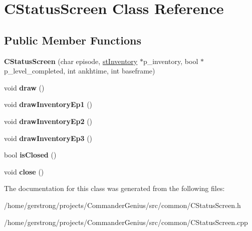 \hypertarget{class_c_status_screen}{
\section{CStatusScreen Class Reference}
\label{class_c_status_screen}
}
\subsection*{Public Member Functions}
\begin{DoxyCompactItemize}
\item 
\hypertarget{class_c_status_screen_ab32df5e8823c2b4a87e562864335e7ad}{
{\bfseries CStatusScreen} (char episode, \hyperlink{structst_inventory}{stInventory} $\ast$p\_\-inventory, bool $\ast$p\_\-level\_\-completed, int ankhtime, int baseframe)}
\label{class_c_status_screen_ab32df5e8823c2b4a87e562864335e7ad}

\item 
\hypertarget{class_c_status_screen_a5b16b474ebfabe111faf05dad3a9fea5}{
void {\bfseries draw} ()}
\label{class_c_status_screen_a5b16b474ebfabe111faf05dad3a9fea5}

\item 
\hypertarget{class_c_status_screen_a68800faad9447bea521258c5caf874be}{
void {\bfseries drawInventoryEp1} ()}
\label{class_c_status_screen_a68800faad9447bea521258c5caf874be}

\item 
\hypertarget{class_c_status_screen_a2e3e547c8dff5df4187a3d7674bf4323}{
void {\bfseries drawInventoryEp2} ()}
\label{class_c_status_screen_a2e3e547c8dff5df4187a3d7674bf4323}

\item 
\hypertarget{class_c_status_screen_a4ba38b288e1a9d3b597170f899bbe216}{
void {\bfseries drawInventoryEp3} ()}
\label{class_c_status_screen_a4ba38b288e1a9d3b597170f899bbe216}

\item 
\hypertarget{class_c_status_screen_a67db345ebd44b962f7fd5caceef7ffbc}{
bool {\bfseries isClosed} ()}
\label{class_c_status_screen_a67db345ebd44b962f7fd5caceef7ffbc}

\item 
\hypertarget{class_c_status_screen_a7b6350aea0c45b21c3c7a61f3ae2e267}{
void {\bfseries close} ()}
\label{class_c_status_screen_a7b6350aea0c45b21c3c7a61f3ae2e267}

\end{DoxyCompactItemize}


The documentation for this class was generated from the following files:\begin{DoxyCompactItemize}
\item 
/home/gerstrong/projects/CommanderGenius/src/common/CStatusScreen.h\item 
/home/gerstrong/projects/CommanderGenius/src/common/CStatusScreen.cpp\end{DoxyCompactItemize}
